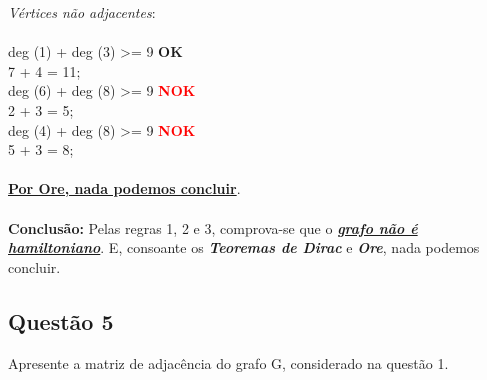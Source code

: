 \documentclass{report}
\begin{document}
\textit{Vértices não adjacentes}:\\\\
deg (1) + deg (3) >= 9 \textbf{OK} \\
7 + 4 = 11;\\
deg (6) + deg (8) >= 9 \textcolor{red}{\textbf{NOK}} \\
2 + 3 = 5;\\
deg (4) + deg (8) >= 9 \textcolor{red}{\textbf{NOK}} \\
5 + 3 = 8;\\\\
\underline{\textbf{Por Ore, nada podemos concluir}}.\\\\
\textbf{Conclusão:} Pelas regras 1, 2 e 3, comprova-se que o \underline{\textit{\textbf{grafo não é hamiltoniano}}}. E, consoante os \textit{\textbf{Teoremas de Dirac}} e \textit{\textbf{Ore}}, nada podemos concluir.

\subsection{Questão 5}
Apresente a matriz de adjacência do grafo G, considerado na questão 1.\\
\citet{quaresma_2009}
\end{document}
